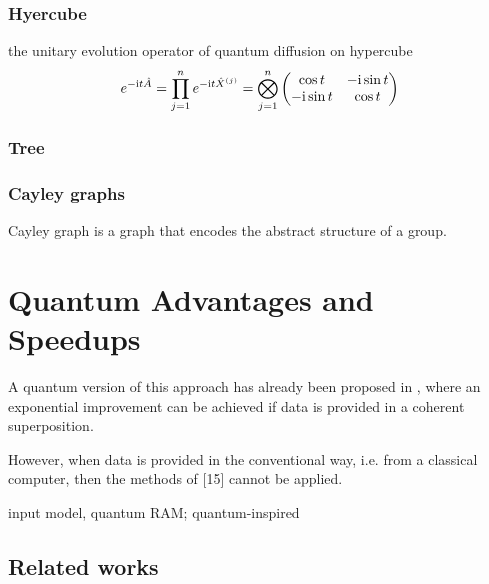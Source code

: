 \subsubsection{Hyercube}
the unitary evolution operator of quantum diffusion on hypercube
\begin{equation}
	e^{-\textup{i} t \hat{A}} = 
	\prod_{j=1}^n e^{-\textup{i} t \hat{X}^{(j)} }
	= \bigotimes_{j=1}^n
	\begin{pmatrix}
		\cos t & -\textup{i} \sin t \\ 
		-\textup{i} \sin t & \cos t
	\end{pmatrix}
\end{equation}

\subsubsection{Tree}

\subsubsection{Cayley graphs}
\begin{definition}\label{def:cayley_graph}
	Cayley graph is a graph that encodes the abstract structure of a group. 
\end{definition}

\section{Quantum Advantages and Speedups}\label{sec:speedup}
A quantum version of this approach has already been proposed in \cite{rebentrostQuantumSupportVector2014},
where an exponential improvement can be achieved if data is provided in a coherent superposition. 
\begin{remark}
	However, when data is provided in the conventional way, i.e. from a classical computer, then the methods of [15] cannot be applied.
\end{remark}
input model, quantum RAM;
quantum-inspired \cite{tangQuantuminspiredClassicalAlgorithm2019}

\subsection{Related works}\label{sec:qke}

